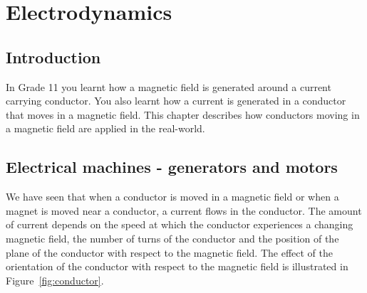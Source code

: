 \chapter{Electrodynamics}
\label{p:em:ed12}



\section{Introduction}
In Grade 11 you learnt how a magnetic field is generated around a current carrying conductor. You also learnt how a current is generated in a conductor that moves in a magnetic field. This chapter describes how conductors moving in a magnetic field are applied in the real-world. 

\section{Electrical machines - generators and motors}

We have seen that when a conductor is moved in a magnetic field or when a magnet is moved near a conductor, a current flows in the conductor. The amount of current depends on the speed at which the conductor experiences a changing magnetic field, the number of turns of the conductor and the position of the plane of the conductor with respect to the magnetic field. The effect of the orientation of the conductor with respect to the magnetic field is illustrated in Figure~\ref{fig:conductor}. 

